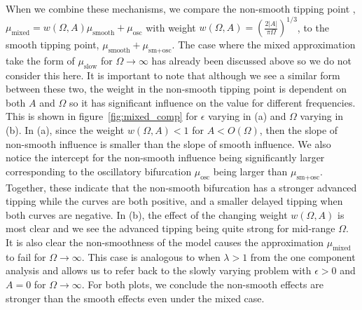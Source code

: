 \indent When we combine these mechanisms, we compare the non-smooth tipping point , $\mu_{\text{mixed}}=w(\Omega,A) \mu_{\text{smooth}}+\mu_{\text{osc}}$ with weight $w(\Omega,A)=(\frac{2|A|}{\pi\Omega})^{1/3}$, to the smooth tipping point, $\mu_{\text{smooth}}+\mu_{\text{sm+osc}}$. The case where the mixed approximation take the form of $\mu_{\text{slow}}$ for $\Omega\to\infty$ has already been discussed above so we do not consider this here. It is important to note that although we see a similar form between these two, the weight in the non-smooth tipping point is dependent on both $A$ and $\Omega$ so it has significant influence on the value for different frequencies. This is shown in figure~\ref{fig:mixed_comp} for $\epsilon$ varying in (a) and $\Omega$ varying in (b). In (a), since the weight $w(\Omega,A)<1$ for $A<O(\Omega)$, then the slope of non-smooth influence is smaller than the slope of smooth influence. We also notice the intercept for the non-smooth influence being significantly larger corresponding to the oscillatory bifurcation $\mu_{\text{osc}}$ being larger than $\mu_{\text{sm+osc}}$. Together, these indicate that the non-smooth bifurcation has a stronger advanced tipping while the curves are both positive, and a smaller delayed tipping when both curves are negative. In (b), the effect of the changing weight $w(\Omega,A)$ is most clear and we see the advanced tipping being quite strong for mid-range $\Omega$. It is also clear the non-smoothness of the model causes the approximation $\mu_{\text{mixed}}$ to fail for $\Omega\to\infty$. This case is analogous to when $\lambda>1$ from the one component analysis and allows us to refer back to the slowly varying problem with $\epsilon>0$ and $A=0$ for $\Omega\to\infty$. For both plots, we conclude the non-smooth effects are stronger than the smooth effects even under the mixed case.

